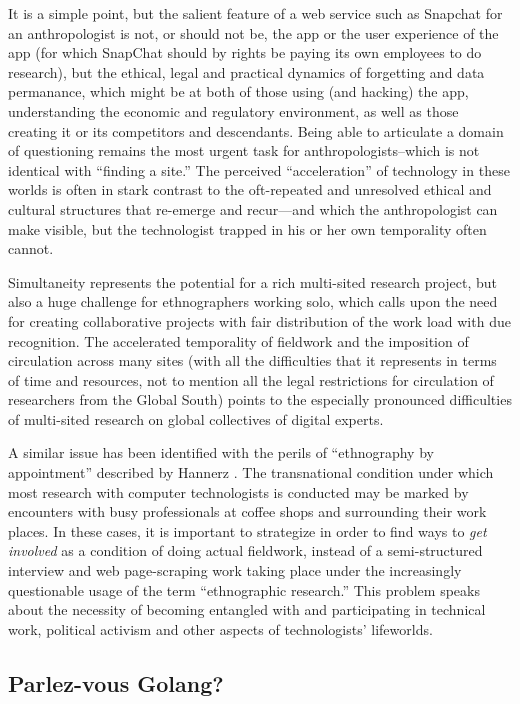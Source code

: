 \documentclass[10pt,letter,oneside]{scrartcl}
\begin{document}
It is a simple point, but the salient feature of a web service such as
Snapchat for an anthropologist is not, or should not be, the app or
the user experience of the app (for which SnapChat should by rights be
paying its own employees to do research), but the ethical, legal and
practical dynamics of forgetting and data permanance, which might be
at both of those using (and hacking) the app, understanding
the economic and regulatory environment, as well as those creating it
or its competitors and descendants.  Being able to articulate a domain
of questioning remains the most urgent task for anthropologists--which
is not identical with ``finding a site.''  The perceived
``acceleration'' of technology in these worlds is often in stark
contrast to the oft-repeated and unresolved ethical and cultural
structures that re-emerge and recur---and which the anthropologist can
make visible, but the technologist trapped in his or her own
temporality often cannot.

Simultaneity represents the potential for a rich multi-sited
research project, but also a huge challenge for ethnographers working
solo, which calls upon the need for creating collaborative projects 
with fair distribution of the work load with due recognition.
The accelerated temporality of fieldwork and the imposition of
circulation across many sites (with all the difficulties that it
represents in terms of time and resources, not to mention all the
legal restrictions for circulation of researchers from the Global
South) points to the especially pronounced difficulties of multi-sited
research on global collectives of digital experts.

A similar issue has been identified with the perils of ``ethnography
by appointment'' described by Hannerz \cite{Hannerz1996}. The
transnational condition \cite{Ribeiro1994} under which most research
with computer technologists is conducted may be marked by encounters
with busy professionals at coffee shops and surrounding their work
places. In these cases, it is important to strategize in order to find
ways to \emph{get involved} as a condition of doing actual fieldwork,
instead of a semi-structured interview and web page-scraping work
taking place under the increasingly questionable usage of the term
``ethnographic research.'' This problem speaks about the necessity of
becoming entangled with and participating in technical work, political
activism and other aspects of technologists' lifeworlds.


\subsection*{Parlez-vous Golang?}
\end{document}
